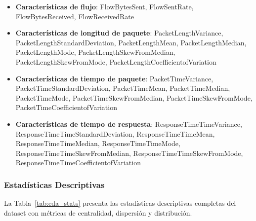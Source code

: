 \begin{itemize}
    \item \textbf{Características de flujo}: FlowBytesSent, FlowSentRate, FlowBytesReceived, FlowReceivedRate
    \item \textbf{Características de longitud de paquete}: PacketLengthVariance, PacketLengthStandardDeviation, PacketLengthMean, PacketLengthMedian, PacketLengthMode, PacketLengthSkewFromMedian, PacketLengthSkewFromMode, PacketLengthCoefficientofVariation
    \item \textbf{Características de tiempo de paquete}: PacketTimeVariance, PacketTimeStandardDeviation, PacketTimeMean, PacketTimeMedian, PacketTimeMode, PacketTimeSkewFromMedian, PacketTimeSkewFromMode, PacketTimeCoefficientofVariation
    \item \textbf{Características de tiempo de respuesta}: ResponseTimeTimeVariance, ResponseTimeTimeStandardDeviation, ResponseTimeTimeMean, ResponseTimeTimeMedian, ResponseTimeTimeMode, ResponseTimeTimeSkewFromMedian, ResponseTimeTimeSkewFromMode, ResponseTimeTimeCoefficientofVariation
\end{itemize}

\subsubsection{Estadísticas Descriptivas}

La Tabla~\ref{tab:eda_stats} presenta las estadísticas descriptivas completas del dataset con métricas de centralidad, dispersión y distribución.

